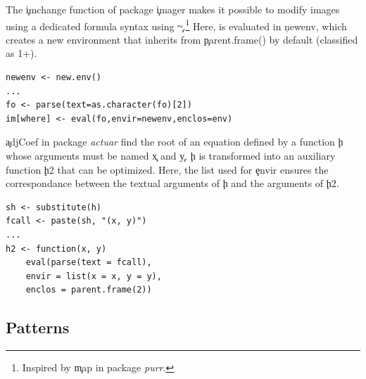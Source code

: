 \documentclass[conference]{IEEEtran}
\begin{document}

The \c{imchange} function of package \c{imager} makes it possible to modify images using a dedicated formula syntax using \c{\~}.\footnote{Inspired by \c{map} in package \emph{purr}.}  Here, \eval is evaluated in \c{newenv}, which creates a new environment that inherits from \c{parent.frame()} by default (classified as 1+).


\begin{lstlisting}
newenv <- new.env()
...
fo <- parse(text=as.character(fo)[2])
im[where] <- eval(fo,envir=newenv,enclos=env)
\end{lstlisting}

\c{adjCoef} in package \emph{actuar} find the root of an equation defined by a function \c{h} whose arguments must be named \c{x} and \c{y}.
\c{h} is transformed into an auxiliary function \c{h2} that can be optimized. Here, the list used for \c{envir} ensures the correspondance between the textual arguments of \c{h} and the arguments of \c{h2}. 


\begin{lstlisting}
sh <- substitute(h)
fcall <- paste(sh, "(x, y)")
...
h2 <- function(x, y)
    eval(parse(text = fcall),
    envir = list(x = x, y = y),
    enclos = parent.frame(2))
\end{lstlisting}

\subsection{Patterns}
\end{document}
